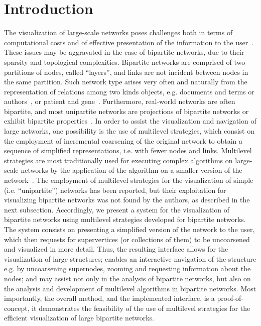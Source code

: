 \documentclass[runningheads]{llncs}
\begin{document}
\section{Introduction}
The visualization of large-scale networks poses challenges both in terms of computational costs
and of effective presentation of the information to the user~\cite{tang,staudt}.
These issues may be aggravated in the case of bipartite networks,
due to their sparsity and topological complexities.
Bipartite networks are comprised of two partitions of nodes,
called ``layers'',
and links are not incident between nodes in the same partition.
Such network type arises very often and naturally from the representation
of relations among two kinds objects,
e.g. documents and terms or authors~\cite{doc,sci,movie}, or patient and gene~\cite{gene}.
Furthermore, real-world networks are often bipartite, and most unipartite networks
are projections of bipartite networks or exhibit bipartite properties~\cite{guillaume0,guillaume}.
In order to assist the visualization and navigation of large networks, one possibility is the use of
multilevel strategies, which consist on the employment of incremental coarsening of the original
network to obtain a sequence of simplified representations, i.e. with fewer nodes and links.
Multilevel strategies are most traditionally used for executing complex algorithms
on large-scale networks by the application of the algorithm on a smaller
version of the network~\cite{alan2,ml2}.
The employment of multilevel strategies for the visualization of simple (i.e. ``unipartite'')
networks has been reported, but their exploitation for visualizing bipartite networks
was not found by the authors, as described in the next subsection.
Accordingly, we present a system for the visualization of bipartite networks using
multilevel strategies developed for bipartite networks.
The system consists on presenting a simplified version of the network to the user, which then
requests for supervertices (or collections of them) to be uncoarsened and visualized in more detail.
Thus, the resulting interface allows for the visualization of large structures;
enables an interactive navigation of the structure e.g. by uncoarsening supernodes, zooming and requesting information about the nodes;
and may assist not only in the analysis of bipartite networks, but also on the analysis and development of multilevel algorithms in bipartite networks.
Most importantly, the overall method, and the implemented interface, is a proof-of-concept, it demonstrates the feasibility of the use of multilevel strategies for the efficient visualization of large bipartite networks.
\end{document}
